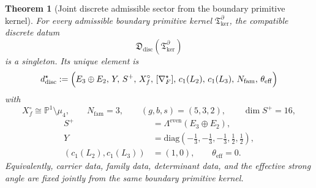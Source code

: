 \documentclass[11pt,a4paper]{article}
\newtheorem{theorem}{Theorem}[section]
\theoremstyle{definition}
\theoremstyle{remark}
\newcommand{\Tker}{\mathfrak T_{\mathrm{ker}}}
\begin{document}
\begin{theorem}[Joint discrete admissible sector from the boundary primitive kernel]
\label{thm:joint-discrete-admissible-sector}
\label{thm:discrete-sector-from-primitive-kernel}
For every admissible boundary primitive kernel $\Tker^\partial$, the compatible discrete datum
\[
\mathfrak D_{\mathrm{disc}}(\Tker^\partial)
\]
is a singleton. Its unique element is
\[
d^\star_{\mathrm{disc}}
:=
\Bigl(
E_3\oplus E_2,\,
Y,\,
S^+,\,
X_f^\circ,\,
[\nabla_F^\star],\,
c_1(L_2),\,
c_1(L_3),\,
N_{\mathrm{fam}},\,
\theta_{\mathrm{eff}}
\Bigr)
\]
with
\[
X_f^\circ\cong\mathbb P^1\setminus\mu_4,
\qquad
N_{\mathrm{fam}}=3,
\qquad
(g,b,s)=(5,3,2),
\qquad
\dim S^+=16,
\]
\[
\begin{aligned}
S^+&=\Lambda^{\mathrm{even}}(E_3\oplus E_2),\\
Y&=\mathrm{diag}\!\left(-\tfrac13,-\tfrac13,-\tfrac13,\tfrac12,\tfrac12\right),\\
(c_1(L_2),c_1(L_3))&=(1,0),\qquad
\theta_{\mathrm{eff}}=0.
\end{aligned}
\]
Equivalently, carrier data, family data, determinant data, and the effective strong angle are fixed
jointly from the same boundary primitive kernel.
\end{theorem}
\end{document}
